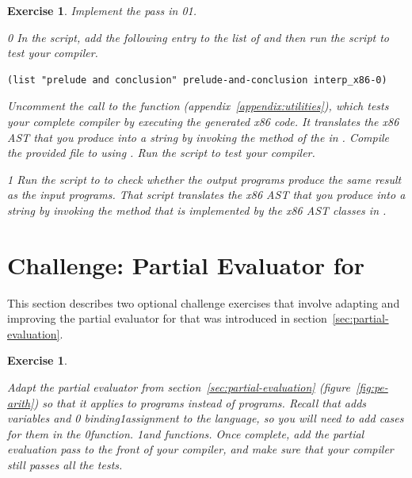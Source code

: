 \documentclass[7x10]{TimesAPriori_MIT}%
\def\racketEd{0}
\def\pythonEd{1}
\def\edition{0}
\newcommand{\racket}[1]{{\if\edition\racketEd{#1}\fi}}
\newcommand{\python}[1]{{\if\edition\pythonEd #1\fi}}
\newtheorem{exercise}[theorem]{Exercise}
\numberwithin{theorem}{chapter}
\numberwithin{definition}{chapter}
\numberwithin{equation}{chapter}
\begin{document}
\begin{exercise}\normalfont\normalsize
%
Implement the  pass in
\racket{}\python{}.
%
{\if\edition\racketEd
In the  script, add the following entry to the
list of  and then run the script to test your compiler.
\begin{lstlisting}
(list "prelude and conclusion" prelude-and-conclusion interp_x86-0)
\end{lstlisting}
%  
Uncomment the call to the  function
(appendix~\ref{appendix:utilities}), which tests your complete
compiler by executing the generated x86 code. It translates the x86
AST that you produce into a string by invoking the 
method of the  in . Compile
the provided  file to  using
. Run the script to test your compiler.
%
\fi}
{\if\edition\pythonEd
%
Run the  script to to check whether the output
programs produce the same result as the input programs. That script
translates the x86 AST that you produce into a string by invoking the
 method that is implemented by the x86 AST classes in
.
%
\fi}

\end{exercise}


\section{Challenge: Partial Evaluator for \LangVar{}}
\label{sec:pe-Lvar}

This section describes two optional challenge exercises that involve
adapting and improving the partial evaluator for \LangInt{} that was
introduced in section~\ref{sec:partial-evaluation}.

\begin{exercise}\label{ex:pe-Lvar}
\normalfont\normalsize
  
Adapt the partial evaluator from section~\ref{sec:partial-evaluation}
(figure~\ref{fig:pe-arith}) so that it applies to \LangVar{} programs
instead of \LangInt{} programs. Recall that \LangVar{} adds variables and
%
\racket{ binding}\python{assignment}
%
to the \LangInt{} language, so you will need to add cases for them in
the 
%
\racket{function.}
%
\python{and  functions.}
%
Once complete, add the partial evaluation pass to the front of your
compiler, and make sure that your compiler still passes all the
tests.
\end{exercise}
\end{document}
